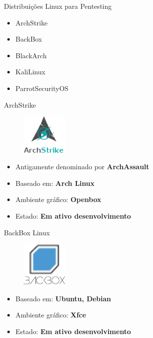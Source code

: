\documentclass{beamer}
\begin{document}
\begin{frame}{Distribuições Linux para Pentesting}

\begin{itemize}
    \item ArchStrike
    \item BackBox
    \item BlackArch
    \item KaliLinux
    \item ParrotSecurityOS
\end{itemize}

\end{frame}
\begin{frame}{ArchStrike}

\begin{figure}[h]
    \includegraphics[width=0.2\textwidth]{distros/archstrike.png}
    \centering
\end{figure}

\begin{itemize}
    \item Antigamente denominado por \textbf{ArchAssault}
    \item Baseado em: \textbf{Arch Linux}
    \item Ambiente gráfico: \textbf{Openbox}
    \item Estado: \textbf{Em ativo desenvolvimento}
\end{itemize}

\end{frame}
\begin{frame}{BackBox Linux}

\begin{figure}[h]
    \includegraphics[width=0.2\textwidth]{distros/backbox.png}
    \centering
\end{figure}

\begin{itemize}
    \item Baseado em: \textbf{Ubuntu, Debian}
    \item Ambiente gráfico: \textbf{Xfce}
    \item Estado: \textbf{Em ativo desenvolvimento}
\end{itemize}

\end{frame}
\end{document}
